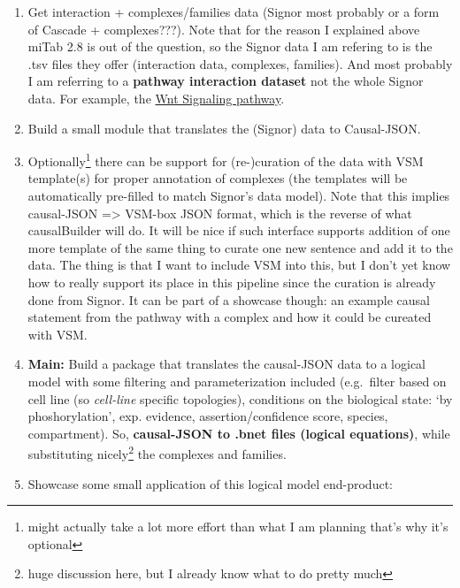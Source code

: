 \documentclass[12pt,]{book}
\providecommand{\tightlist}{%
  \setlength{\itemsep}{0pt}\setlength{\parskip}{0pt}}
\let\rmarkdownfootnote\footnote%
\def\footnote{\protect\rmarkdownfootnote}
\begin{document}
\begin{enumerate}
\def\labelenumi{\arabic{enumi}.}
\tightlist
\item
  Get interaction + complexes/families data (Signor most probably or a form of Cascade + complexes???). Note that for the reason I explained above miTab 2.8 is out of the question, so the Signor
  data I am refering to is the .tsv files they offer (interaction data, complexes, families). And
  most probably I am referring to a \textbf{pathway interaction dataset} not the whole Signor data. For example, the \href{https://signor.uniroma2.it/pathway_browser.php?organism=human\&pathway_list=SIGNOR-WNT\&level=1}{Wnt Signaling pathway}.
\item
  Build a small module that translates the (Signor) data to Causal-JSON.
\item
  Optionally\footnote{might actually take a lot more effort than what I am planning that's why it's optional}
  there can be support for (re-)curation of the data with VSM template(s) for proper annotation of complexes (the templates will be automatically pre-filled to match Signor's data model). Note that this implies causal-JSON =\textgreater{} VSM-box JSON format, which is the reverse
  of what causalBuilder will do. It will be nice if such interface supports addition
  of one more template of the same thing to curate one new sentence and add it to the data.
  The thing is that I want to include VSM into this, but I don't yet know how to really support
  its place in this pipeline since the curation is already done from Signor. It can be
  part of a showcase though: an example causal statement from the pathway with a complex
  and how it could be cureated with VSM.
\item
  \textbf{Main:} Build a package that translates the causal-JSON data to a logical model with
  some filtering and parameterization included (e.g.~filter based on cell line (so \emph{cell-line} specific topologies), conditions on the biological state: `by phoshorylation', exp. evidence, assertion/confidence score, species, compartment).
  So, \textbf{causal-JSON to .bnet files (logical equations)}, while substituting nicely\footnote{huge
    discussion here, but I already know what to do pretty much} the complexes and families.
\item
  Showcase some small application of this logical model end-product:


\end{enumerate}
\end{document}
